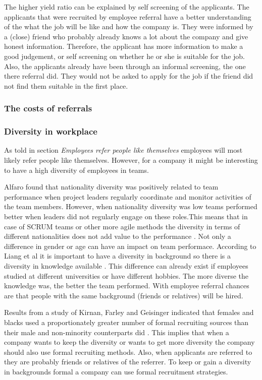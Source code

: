 \documentclass[Main.tex]{subfiles}
\begin{document}
The higher yield ratio can be explained by self screening of the applicants. The applicants that were recruited by employee referral have a better understanding of the what the job will be like and how the company is. They were informed by a (close) friend who probably already knows a lot about the company and give honest information. Therefore, the applicant has more information to make a good judgement, or self screening on whether he or she is suitable for the job. Also, the applicants already have been through an informal screening, the one there referral did. They would not be asked to apply for the job if the friend did not find them suitable in the first place. 

\subsubsection*{The costs of referrals}

\subsubsection*{Diversity in workplace}
As told in section \emph{Employees refer people like themselves} employees will most likely refer people like themselves. However, for a company it might be interesting to have a high diversity of employees in teams. 

Alfaro found that nationality diversity was positively related to team performance when project leaders regularly coordinate and monitor activities of the team members. However, when nationality diversity was low teams performed better when leaders did 
not regularly engage on these roles.This means that in case of SCRUM teams or other more agile methods the diversity in terms of different nationalities does not add value to the performance \cite{diversity}.
Not only a difference in gender or age can have an impact on team performace. According to Liang et al it is important to have a diversity in background so there is a diversity in knowledge available \cite{teamdiversity}. This difference can already exist if employees studied at different universities or have different hobbies. The more diverse the knowledge was, the better the team performed. With employee referral chances are that people with the same background (friends or relatives) will be hired. 

Results from a study of Kirnan, Farley and Geisinger indicated that females and blacks used a proportionately greater number of formal recruiting sources than their male and non-minority counterparts did \cite{tenth}. This implies that when a company wants to keep the diversity or wants to get more diversity the company should also use formal recruiting methods. Also, when applicants are referred to they are probably friends or relatives of the referrer. To keep or gain a diversity in backgrounds formal a company can use formal recruitment strategies.
\end{document}
